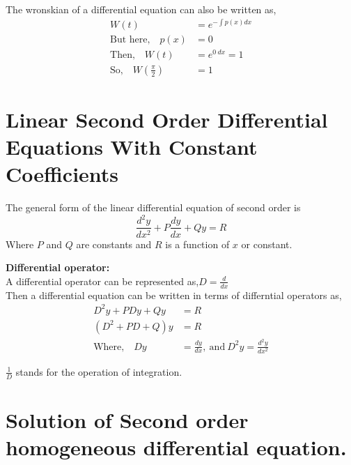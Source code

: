 \begin{answer}
	The wronskian of a differential equation can also be written as,
	\begin{align*}
	W(t)&=e^{-\int p(x)dx}\\
	\text{But here,}\quad  p(x)&=0\\
	\text{Then,} \quad W(t)&=e^{0 \ dx}=1\\
	\text{So,}\quad W(\frac{\pi}{2})&=1
	\end{align*}
\end{answer}
\section{Linear Second Order Differential Equations With Constant Coefficients}
The general form of the linear differential equation of second order is
$$
\frac{d^{2} y}{d x^{2}}+P \frac{d y}{d x}+Q y=R
$$
Where $P$ and $Q$ are constants and $R$ is a function of $x$ or constant.\begin{note}\textbf{Differential operator:}\\
	A differential operator can be represented as,\quad $D=\frac{d}{dx}$
\\Then a differential equation can be written  in terms of differntial operators as,
\begin{align*}
D^{2} y+P D y+Q y&=R \\ \left(D^{2}+P D+Q\right) y&=R\\
\text{Where,}\quad D y&=\frac{d y}{d x}, \ \text{and}\ D^{2} y=\frac{d^{2} y}{d x^{2}}
\end{align*}

$\frac{1}{D}$ stands for the operation of integration.	
\end{note}
\section{Solution of Second order homogeneous differential equation.}

